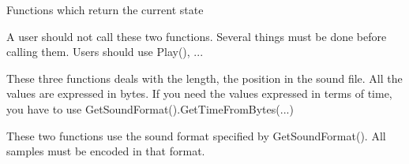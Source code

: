 
Functions which return the current state


\label{wxsoundfilestreamispaused}



\label{wxsoundfilestreamstartproduction}


A user should not call these two functions.
Several things must be done before calling them.
Users should use Play(), ... 


\label{wxsoundfilestreamstopproduction}



\label{wxsoundfilestreamgetlength}


These three functions deals with the length, the position in the sound file.
All the values are expressed in bytes. If you need the values expressed
in terms of time, you have to use GetSoundFormat().GetTimeFromBytes(...)


\label{wxsoundfilestreamgetposition}



\label{wxsoundfilestreamsetposition}



\label{wxsoundfilestreamread}


These two functions use the sound format specified by GetSoundFormat().
All samples must be encoded in that format. 


\label{wxsoundfilestreamwrite}



\label{wxsoundfilestreamsetsoundformat}


